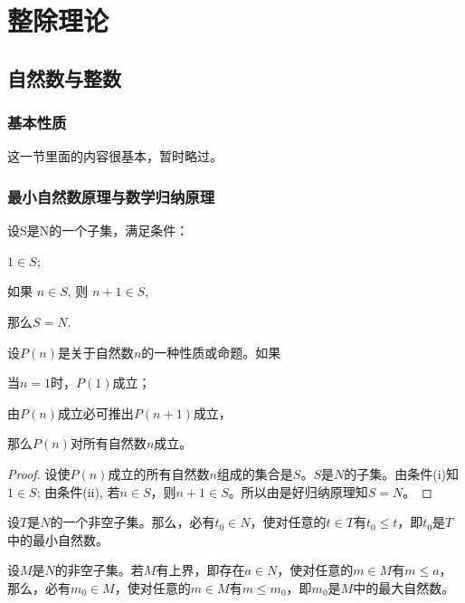 \chapter{整除理论}
\section{自然数与整数}
\subsection{基本性质}
这一节里面的内容很基本，暂时略过。
\subsection{最小自然数原理与数学归纳原理}
\begin{axiom}[归纳原(公)理] 设S是N的一个子集，满足条件：
	\begin{axiomenum}
		\item $1 \in S$;
		\item 如果 $n \in S$, 则 $n + 1 \in S$,
	\end{axiomenum}
	那么$S=N$.
\end{axiom}

\begin{theorem}[数学归纳法] 设$P(n)$是关于自然数$n$的一种性质或命题。如果
	\begin{axiomenum}
		\item 当$n=1$时，$P(1)$成立；
		\item 由$P(n)$成立必可推出$P(n+1)$成立，
	\end{axiomenum}
	那么$P(n)$对所有自然数$n$成立。
\end{theorem}

\begin{proof}
	设使$P(n)$成立的所有自然数$n$组成的集合是$S$。$S$是$N$的子集。由条件(i)知$1 \in S$;	由条件(ii), 若$n \in S$，则$n + 1 \in S$。所以由是好归纳原理知$S=N$。
\end{proof}

\begin{theorem}[最小自然数原理]
	设$T$是$N$的一个非空子集。那么，必有$t_0 \in N$，使对任意的$t \in T$有$t_0 \le t$，即$t_0$是$T$中的最小自然数。
\end{theorem}

\begin{theorem}[最大自然数原理]
设$M$是$N$的非空子集。若$M$有上界，即存在$a\in N$，使对任意的$m \in M$有$m \le a$，那么，必有$m_0 \in M$，使对任意的$m
\in M$有$m \le m_0$，即$m_0$是$M$中的最大自然数。
\end{theorem}
